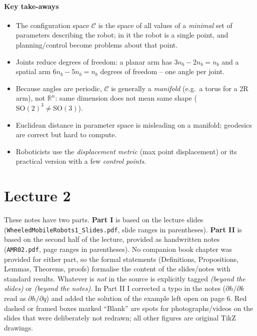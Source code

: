 \documentclass[11pt,a4paper]{article}
\newcommand{\R}{\mathbb{R}}
\newcommand{\C}{\mathcal{C}}
\newcommand{\SO}{\mathrm{SO}}
\theoremstyle{definition}
\theoremstyle{plain}
\theoremstyle{remark}
\begin{document}
\subsection{Key take-aways}

\begin{itemize}
  \item The configuration space $\C$ is the space of all values of a \emph{minimal} set of parameters describing the robot; in it the robot is a single point, and planning/control become problems about that point.
  \item Joints reduce degrees of freedom: a planar arm has $3n_b-2n_b=n_b$ and a spatial arm $6n_b-5n_b=n_b$ degrees of freedom -- one angle per joint.
  \item Because angles are periodic, $\C$ is generally a \emph{manifold} (e.g.\ a torus for a 2R arm), not $\R^n$: same dimension does not mean same shape ($\SO(2)^3\ne\SO(3)$).
  \item Euclidean distance in parameter space is misleading on a manifold; geodesics are correct but hard to compute.
  \item Roboticists use the \emph{displacement metric} (max point displacement) or its practical version with a few \emph{control points}.
\end{itemize}

\newpage

\setcounter{section}{0}
\renewcommand{\thesection}{\arabic{section}}
\part{Lecture 2}

\begin{tcolorbox}[colback=gray!5, colframe=black!40, boxrule=0.4pt, title={About these notes}, fonttitle=\bfseries, coltitle=black, colbacktitle=gray!15]
\small
These notes have two parts. \textbf{Part I} is based on the lecture slides (\texttt{WheeledMobileRobots1\_Slides.pdf}, slide ranges in parentheses). \textbf{Part II} is based on the second half of the lecture, provided as handwritten notes (\texttt{AMR02.pdf}, page ranges in parentheses). No companion book chapter was provided for either part, so the formal statements (Definitions, Propositions, Lemmas, Theorems, proofs) formalise the content of the slides/notes with standard results. Whatever is \emph{not} in the source is explicitly tagged \emph{(beyond the slides)} or \emph{(beyond the notes)}. In Part II I corrected a typo in the notes ($\partial h/\partial k$ read as $\partial h/\partial q$) and added the solution of the example left open on page 6. Red dashed or framed boxes marked ``Blank'' are spots for photographs/videos on the slides that were deliberately not redrawn; all other figures are original TikZ drawings.
\end{tcolorbox}
 
\end{document}
